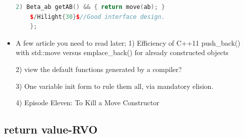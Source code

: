 \documentclass[a4paper,12pt,twoside]{book}
\begin{document}
\begin{itemize}
\begin{lstlisting}[frame=single, language=c++,mathescape=true]
	2) Beta_ab getAB() && { return move(ab); }
	$/Hilight{30}$//Good interface design.
	};
\end{lstlisting}
	
	\item A few article you need to read later;
	1) Efficiency of C++11 push\_back() with std::move versus emplace\_back() for already constructed objects
	
	2) view the default functions generated by a compiler?
	
	3) One variable init form to rule them all, via mandatory elision.
	
	4) Episode Eleven: To Kill a Move Constructor
	
\end{itemize}



\subsection{return value-RVO}
\end{document}
